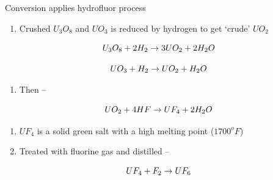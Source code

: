 \documentclass[aspectratio=1610,pdftex,dvipsnames,compress,xcolor={dvipsnames}]{beamer}
\begin{document}
\begin{frame}{Conversion applies hydrofluor process}
    \begin{enumerate}[topsep=0pt,itemsep=18pt,leftmargin=*,label=(\arabic*)]
        \item[]Crushed $U_3O_8$ and $UO_3$ is reduced by hydrogen to get `crude' $UO_2$
    \end{enumerate}

    \vspace*{\fill}

    \begin{equation}
        \LARGE
        U_3O_8 + 2H_2 \rightarrow 3UO_2 + 2H_2O
    \end{equation}
    
    \begin{equation}
        \LARGE
        UO_3 + H_2 \rightarrow UO_2 + H_2O
    \end{equation}

    \vspace*{\fill}

    \begin{enumerate}[topsep=0pt,itemsep=18pt,leftmargin=*,label=(\arabic*)]
        \item[]Then --
    \end{enumerate}

    \vspace*{\fill}

    \begin{equation}
        \LARGE
        UO_2 + 4HF \rightarrow UF_4 + 2H_2O
    \end{equation}
    
    \vspace*{\fill}

    \begin{enumerate}[topsep=0pt,itemsep=11pt,leftmargin=*,label=(\arabic*)]
        \item[]$UF_4$ is a solid green salt with a high melting point ($1700^oF$)
        \item[]Treated with fluorine gas and distilled -- 
    \end{enumerate}

    \vspace*{\fill}

    \begin{equation}
        \LARGE
        UF_4 + F_2 \rightarrow UF_6
    \end{equation}
\end{frame}
\end{document}
